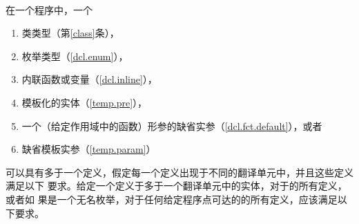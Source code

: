 \paragraph{} %
在一个程序中，一个
\begin{enumerate}
  \item 类类型（第\ref{class}条），
  \item 枚举类型（\ref{dcl.enum}），
  \item 内联函数或变量（\ref{dcl.inline}），
  \item 模板化的实体（\ref{temp.pre}），
  \item 一个（给定作用域中的函数）形参的缺省实参（\ref{dcl.fct.default}），或者
  \item 缺省模板实参（\ref{temp.param}）
\end{enumerate}
可以具有多于一个定义，假定每一个定义出现于不同的翻译单元中，并且这些定义满足以下
要求。给定一个定义于多于一个翻译单元中的实体，对于的所有定义，或者如
果是一个无名枚举，对于任何给定程序点可达的的所有定义，应该满足以下要求。
